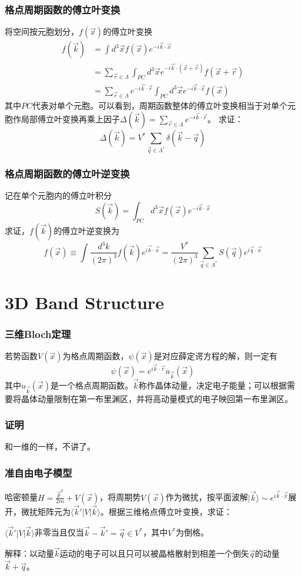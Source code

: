 \documentclass[CJK]{beamer}
\def\secpage#1#2{\begin{frame}\bch\bcenter{\bf \Huge #1} \skipline \tbox{#2}\ecenter\ech\end{frame}}
\begin{document}
\begin{frame}
\frametitle{\bch 格点周期函数的傅立叶变换 \ech}
\bch
将空间按元胞划分，$f(\vec x)$的傅立叶变换
$$
\begin{aligned}
f(\vec k) &= \int d^3 \vec x f(\vec x) e^{-i\vec k \cdot \vec x} \\
&= \sum_{\vec r \in \Lambda} \int_{PC} d^3 \vec x e^{-i\vec k \cdot (\vec x + \vec r)} f(\vec x + \vec r) \\
&= \sum_{\vec r \in \Lambda} e^{-i\vec k \cdot \vec r} \int_{PC} d^3 \vec x e^{-i\vec k \cdot \vec x} f(\vec x)
\end{aligned}
$$
其中$PC$代表对单个元胞。可以看到，周期函数整体的傅立叶变换相当于对单个元胞作局部傅立叶变换再乘上因子$\varDelta (\vec k) = \sum_{\vec r \in \Lambda} e^{-i\vec k \cdot \vec r}
$。
求证：$$\varDelta(\vec k) = V^* \sum_{\vec q \in \Lambda^*} \delta(\vec k - \vec q)$$
\ech
\end{frame}

\begin{frame}
\frametitle{\bch 格点周期函数的傅立叶逆变换 \ech}
\bch
记在单个元胞内的傅立叶积分
$$
S(\vec k ) = \int_{PC} d^3 \vec x f(\vec x) e^{-i \vec k \cdot \vec x}
$$
求证，$f(\vec k)$的傅立叶逆变换为
$$
f(\vec x) \equiv \int \frac{d^3 k}{(2\pi)^3} f(\vec k) e^{i\vec k \cdot \vec x} = \frac{V^*}{(2\pi)^3} \sum_{\vec q \in \Lambda^*} S(\vec q)e^{i\vec q \cdot \vec x}
$$
\ech
\end{frame}

\section{3D Band Structure}
\secpage{晶体能带结构}{周期势作为微扰}


\begin{frame}
\frametitle{\bch 三维Bloch定理 \ech}
\bch
若势函数$V(\vec x)$为格点周期函数，$\psi(\vec x)$是对应薛定谔方程的解，则一定有
$$
\psi(\vec x) = e^{i\vec k \cdot \vec r} u_{\vec k} (\vec x)
$$
其中$u_{\vec k} (\vec x)$是一个格点周期函数。$\vec k$称作晶体动量，决定电子能量；可以根据需要将晶体动量限制在第一布里渊区，并将高动量模式的电子映回第一布里渊区。
\ech
\end{frame}

\begin{frame}
\frametitle{\bch 证明 \ech}
\bch
和一维的一样，不讲了。
\ech
\end{frame}

\begin{frame}
\frametitle{\bch 准自由电子模型 \ech}
\bch
哈密顿量$H = \frac{\vec p^2}{2m} + V(\vec x)$，将周期势$V(\vec x)$作为微扰，按平面波解$| \vec k \rangle \sim e^{i \vec k \cdot \vec x}$展开，微扰矩阵元为$\langle \vec{k}' | V | \vec{k} \rangle$。根据三维格点傅立叶变换，求证：
\par
$\langle \vec{k}' | V | \vec{k} \rangle$非零当且仅当$\vec k - \vec{k}' = \vec q \in V^*$，其中$V^*$为倒格。
\par
解释：以动量$\vec k$运动的电子可以且只可以被晶格散射到相差一个倒矢$\vec q$的动量$\vec k + \vec q$。
\ech
\end{frame}
\end{document}
